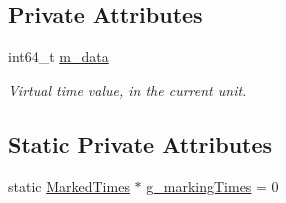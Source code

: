 \subsection*{Private Attributes}
\begin{DoxyCompactItemize}
\item 
int64\+\_\+t \hyperlink{classns3_1_1Time_aa189a3efe01c8a8dc78d94ca85763ea9}{m\+\_\+data}
\begin{DoxyCompactList}\small\item\em Virtual time value, in the current unit. \end{DoxyCompactList}\end{DoxyCompactItemize}
\subsection*{Static Private Attributes}
\begin{DoxyCompactItemize}
\item 
static \hyperlink{classns3_1_1Time_add356cdcb7ac7730a0f9ad22770f81cc}{Marked\+Times} $\ast$ \hyperlink{classns3_1_1Time_aa01dcd3b61742fd80eedd17834497ab7}{g\+\_\+marking\+Times} = 0
\end{DoxyCompactItemize}
